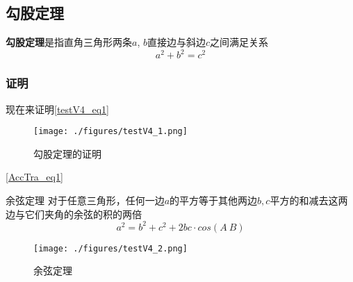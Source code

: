 
\subsection{勾股定理}
\textbf{勾股定理}是指直角三角形两条$a$, $b$直接边与斜边$c$之间满足关系
\begin{equation}\label{testV4_eq1}
a^2 + b^2 = c^2
\end{equation}

\subsubsection{证明}
现在来证明\autoref{testV4_eq1}

\begin{figure}[ht]
\centering
\texttt{[image: ./figures/testV4\_1.png]}
\caption{勾股定理的证明} \label{testV4_fig1}
\end{figure}
\autoref{AccTra_eq1}
\begin{theorem}{余弦定理}
对于任意三角形，任何一边$a$的平方等于其他两边$b, c$平方的和减去这两边与它们夹角的余弦的积的两倍
\begin{equation}
a^2 = b^2 + c^2 + 2bc\cdot cos(A~B)
\end{equation}
\end{theorem}
\begin{figure}[ht]
\centering
\texttt{[image: ./figures/testV4\_2.png]}
\caption{余弦定理} \label{testV4_fig2}
\end{figure}